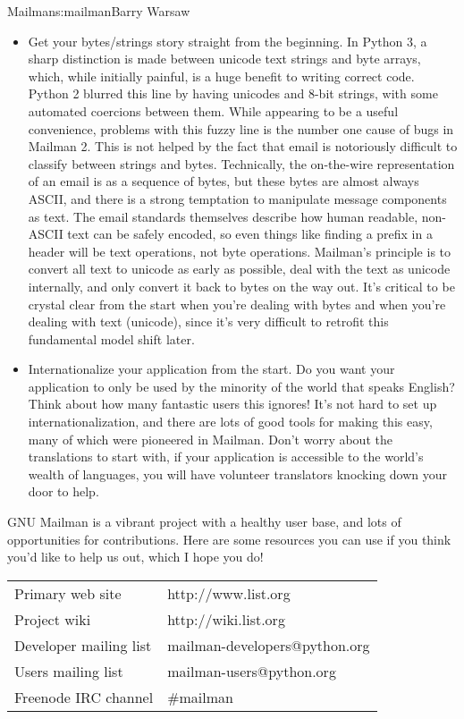 \begin{aosachapter}{Mailman}{s:mailman}{Barry Warsaw}
\begin{itemize}
\item Get your bytes/strings story straight from the beginning.  In Python 3, a
sharp distinction is made between unicode text strings and byte arrays,
which, while initially painful, is a huge benefit to writing correct code.
Python 2 blurred this line by having unicodes and 8-bit strings, with some
automated coercions between them.  While appearing to be a useful
convenience, problems with this fuzzy line is the number one cause of bugs
in Mailman 2.  This is not helped by the fact that email is notoriously
difficult to classify between strings and bytes.  Technically, the
on-the-wire representation of an email is as a sequence of bytes, but these
bytes are almost always ASCII, and there is a strong temptation to
manipulate message components as text.  The email standards themselves
describe how human readable, non-ASCII text can be safely encoded, so even
things like finding a  prefix in a  header will be text
operations, not byte operations.  Mailman's principle is to convert all text
to unicode as early as possible, deal with the text as unicode internally,
and only convert it back to bytes on the way out.  It's critical to be
crystal clear from the start when you're dealing with bytes and when you're
dealing with text (unicode), since it's very difficult to retrofit this
fundamental model shift later.

\item Internationalize your application from the start.  Do you want your
application to only be used by the minority of the world that speaks
English?  Think about how many fantastic users this ignores!  It's not hard
to set up internationalization, and there are lots of good tools for making
this easy, many of which were pioneered in Mailman.  Don't worry about the
translations to start with, if your application is accessible to the world's
wealth of languages, you will have volunteer translators knocking down your
door to help.

\end{itemize}

GNU Mailman is a vibrant project with a healthy user base, and lots
of opportunities for contributions.  Here are some resources you can use if
you think you'd like to help us out, which I hope you do!

\begin{tabular}{ll}
Primary web site & http://www.list.org \\
Project wiki & http://wiki.list.org \\
Developer mailing list & mailman-developers@python.org \\
Users mailing list & mailman-users@python.org \\
Freenode IRC channel & \#mailman
\end{tabular}

\end{aosachapter}
